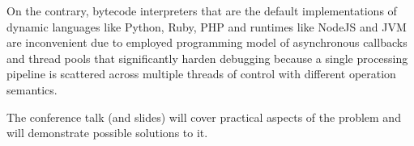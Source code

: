 \documentclass[10pt, a5paper]{article}
\begin{document}
On the contrary, bytecode interpreters that are the default implementations of dynamic languages like Python, Ruby, PHP and runtimes like NodeJS and JVM are inconvenient due to employed programming model of asynchronous callbacks and thread pools that significantly harden debugging because a single processing pipeline is scattered across multiple threads of control with different operation semantics.

The conference talk (and slides) will cover practical aspects of the problem and will demonstrate possible solutions to it.
\end{document}
